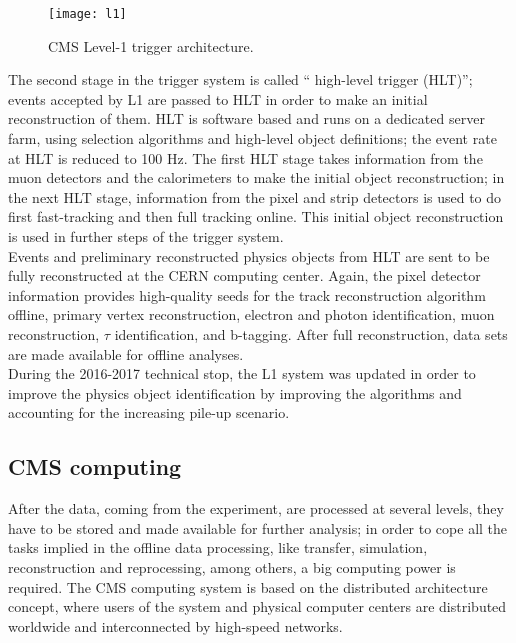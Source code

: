 \begin{figure}[h!]
  \centering
  \texttt{[image: l1]}
  \caption[CMS Level-1 trigger architecture]{CMS Level-1 trigger architecture\cite{l1}. }
  \label{fig:l1}
\end{figure}

\noindent The second stage in the trigger system is called `` high-level trigger (HLT)''; events accepted by L1 are passed to HLT in order to make an initial reconstruction of them. HLT is software based and runs on a dedicated server farm, using selection algorithms and high-level object definitions; the event rate at HLT is reduced to 100 Hz. The first HLT stage takes information from the muon detectors and the calorimeters to make the initial object reconstruction; in the next HLT stage, information from the pixel and strip detectors is used to do first fast-tracking and then full tracking online. This initial object reconstruction is used in further steps of the trigger system. \\

\noindent Events and preliminary reconstructed physics objects from HLT are sent to be fully reconstructed at the CERN computing center. Again, the pixel detector information provides high-quality seeds for the track reconstruction algorithm offline, primary vertex reconstruction, electron and photon identification, muon reconstruction, $\tau$ identification, and b-tagging. After full reconstruction, data sets are made available for offline analyses.\\ 

\noindent During the 2016-2017 technical stop, the L1 system was updated in order to improve the physics object identification by improving the algorithms and accounting for the increasing pile-up scenario.  

\subsection{CMS computing}

\noindent After the data, coming from the experiment, are processed at several levels, they have to be stored and made available for further analysis; in order to cope all the tasks implied in the offline data processing, like transfer, simulation, reconstruction and reprocessing, among others, a big computing power is required. The CMS computing system is based on the distributed architecture concept, where users of the system and physical computer centers are distributed worldwide and interconnected by high-speed networks.

